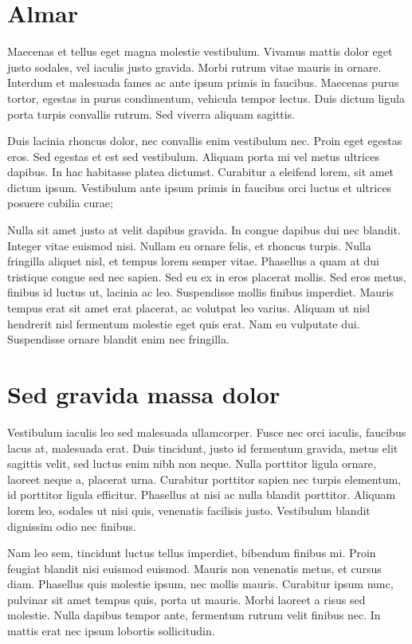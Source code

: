 \section{Almar}

Maecenas et tellus eget magna molestie vestibulum. Vivamus mattis dolor eget justo sodales, vel iaculis justo gravida. Morbi rutrum vitae mauris in ornare. Interdum et malesuada fames ac ante ipsum primis in faucibus. Maecenas purus tortor, egestas in purus condimentum, vehicula tempor lectus. Duis dictum ligula porta turpis convallis rutrum. Sed viverra aliquam sagittis.

Duis lacinia rhoncus dolor, nec convallis enim vestibulum nec. Proin eget egestas eros. Sed egestas et est sed vestibulum. Aliquam porta mi vel metus ultrices dapibus. In hac habitasse platea dictumst. Curabitur a eleifend lorem, sit amet dictum ipsum. Vestibulum ante ipsum primis in faucibus orci luctus et ultrices posuere cubilia curae;

Nulla sit amet justo at velit dapibus gravida. In congue dapibus dui nec blandit. Integer vitae euismod nisi. Nullam eu ornare felis, et rhoncus turpis. Nulla fringilla aliquet nisl, et tempus lorem semper vitae. Phasellus a quam at dui tristique congue sed nec sapien. Sed eu ex in eros placerat mollis. Sed eros metus, finibus id luctus ut, lacinia ac leo. Suspendisse mollis finibus imperdiet. Mauris tempus erat sit amet erat placerat, ac volutpat leo varius. Aliquam ut nisl hendrerit nisl fermentum molestie eget quis erat. Nam eu vulputate dui. Suspendisse ornare blandit enim nec fringilla.

\section{Sed gravida massa dolor}

Vestibulum iaculis leo sed malesuada ullamcorper. Fusce nec orci iaculis, faucibus lacus at, malesuada erat. Duis tincidunt, justo id fermentum gravida, metus elit sagittis velit, sed luctus enim nibh non neque. Nulla porttitor ligula ornare, laoreet neque a, placerat urna. Curabitur porttitor sapien nec turpis elementum, id porttitor ligula efficitur. Phasellus at nisi ac nulla blandit porttitor. Aliquam lorem leo, sodales ut nisi quis, venenatis facilisis justo. Vestibulum blandit dignissim odio nec finibus.

Nam leo sem, tincidunt luctus tellus imperdiet, bibendum finibus mi. Proin feugiat blandit nisi euismod euismod. Mauris non venenatis metus, et cursus diam. Phasellus quis molestie ipsum, nec mollis mauris. Curabitur ipsum nunc, pulvinar sit amet tempus quis, porta ut mauris. Morbi laoreet a risus sed molestie. Nulla dapibus tempor ante, fermentum rutrum velit finibus nec. In mattis erat nec ipsum lobortis sollicitudin. 

